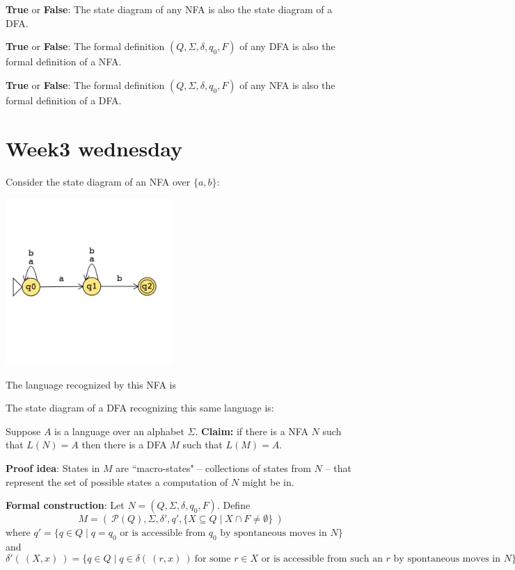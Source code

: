 \documentclass[12pt, oneside]{article}
\begin{document}
{\bf True} or {\bf False}: The state diagram of any NFA is also the state diagram of a DFA.

{\bf True} or {\bf False}: The formal definition $(Q, \Sigma, \delta, q_0, F)$ of any DFA is also the formal definition of a NFA.

{\bf True} or {\bf False}: The formal definition $(Q, \Sigma, \delta, q_0, F)$  of any NFA is also the formal definition of a DFA.

 \vfill
\section*{Week3 wednesday}



Consider the state diagram of an NFA over $\{a,b\}$:

\includegraphics[width=2.5in]{../../resources/machines/Lect6NFA1.png}


The language recognized by this NFA is



The state diagram of a DFA recognizing this same language is:

\vspace{70pt}
Suppose $A$ is a language over an alphabet $\Sigma$.
{\bf Claim:} if there is a NFA $N$ such that $L(N) = A$ then 
there is a DFA $M$ such that $L(M) = A$.

{\bf Proof idea}: States in $M$ are ``macro-states" -- collections of states from $N$ -- 
that represent the set of possible states a computation of $N$ might be in.


{\bf Formal construction}: Let $N = (Q, \Sigma, \delta, q_0, F)$.  Define 
\[
M = (~ \mathcal{P}(Q), \Sigma, \delta', q',  \{ X \subseteq Q \mid X \cap F \neq \emptyset \}~ )
\]
where $q' = \{ q \in Q \mid \text{$q = q_0$ or is accessible from $q_0$ by spontaneous moves in $N$} \}$
and 
\[
    \delta' (~(X, x)~) = \{ q \in Q \mid q \in \delta( ~(r,x)~) ~\text{for some $r \in X$ or is accessible 
from such an $r$ by spontaneous moves in $N$} \}
\]
\end{document}
